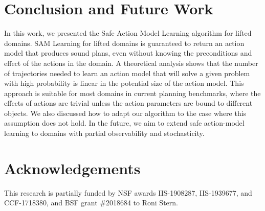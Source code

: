 \documentclass{article}
\begin{document}
\section{Conclusion and Future Work}

In this work, we presented the Safe Action Model Learning algorithm for lifted domains.
SAM Learning for lifted domains is guaranteed to return an action model that produces sound plans, 
even without knowing the preconditions and effect of the actions in the domain.   
A theoretical analysis shows that the number of trajectories needed to learn an action model that will solve a given problem with high probability is linear in the potential size of the action model. 
This approach is suitable for most domains in current planning benchmarks, 
where the effects of actions are trivial unless the action parameters are bound to different objects. 
We also discussed how to adapt our algorithm to the case where this assumption does not hold. 
In the future, we aim to 
extend safe action-model learning to domains with partial observability and stochasticity. 

\section*{Acknowledgements}
This research is partially funded by NSF awards IIS-1908287, IIS-1939677, and CCF-1718380,
and BSF grant \#2018684 to Roni Stern.



\end{document}
